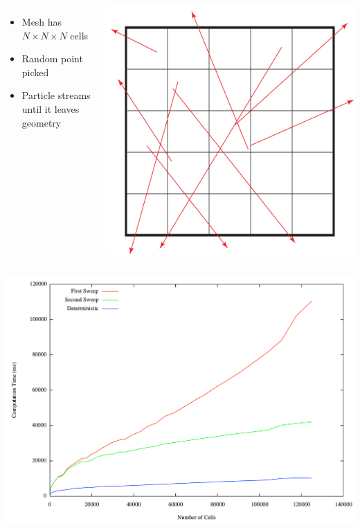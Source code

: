 \documentclass{beamer}
\begin{document}
\begin{frame}
\begin{columns}[c]
\begin{itemize}
    \item Mesh has $N\times N \times N$ cells
    \item Random point picked
    \item Particle streams until it leaves geometry
\end{itemize}

    \includegraphics[width=\textwidth, keepaspectratio]{MeshCompGraphic}
\end{columns}
\end{frame}

\begin{frame}
    \includegraphics[width=\textwidth, keepaspectratio]{MeshComparison}
\end{frame}
\end{document}
